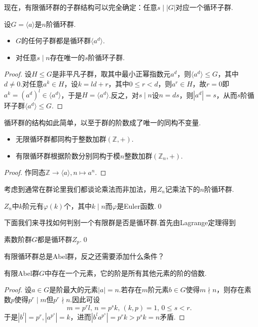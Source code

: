 现在，有限循环群的子群结构可以完全确定：任意$s\mid|G|$对应一个循环子群.
\begin{thm}
	设$G=\langle a\rangle$是$n$阶循环群.
	\begin{itemize}
		\item $G$的任何子群都是循环群$\langle a^d\rangle$.
		\item 对任意$s\mid n$存在唯一的$s$阶循环子群.
	\end{itemize}
\end{thm}
\begin{proof}
	设$H\le G$是非平凡子群，取其中最小正幂指数元$a^d$，则$\langle a^d\rangle\le G$，其中$d\ne 0$.对任意$a^k\in H$，设$k=ld+r$，其中$0\le r<d$，则$a^r\in H$，故$r=0$即$a^k=(a^d)^l\in\langle a^d\rangle $，于是$H=\langle a^d\rangle $.反之，对$s\mid n$设$n=ds$，则$|a^d|=s$，从而$s$阶循环子群$\langle a^d\rangle \le G$.
\end{proof}

循环群的结构如此简单，以至于群的阶数成了唯一的同构不变量.
\begin{thm}[(循环群结构)]
	\begin{itemize}
		\item 无限循环群都同构于整数加群$(\mathbb{Z},+)$.
		\item 有限循环群根据阶数分别同构于模$n$整数加群$(\mathbb{Z}_n,+)$\footnotemark.
	\end{itemize}
\end{thm}
\begin{proof}
	作同态$\mathbb{Z}\to\langle a\rangle ,n\mapsto a^n$.
\end{proof}

考虑到通常在群论里我们都谈论乘法而非加法，用$Z_n$记乘法下的$n$阶循环群.
\begin{cor}
	$Z_n$中$k$阶元有$\varphi(k)$个，其中$k\mid n$而$\varphi$是Euler函数.\qed
\end{cor}

下面我们来寻找如何判别一个有限群是否是循环群.首先由Lagrange定理得到
\begin{thm}
	素数阶群$G$都是循环群$Z_p$.\qed
\end{thm}

有限循环群总是Abel群，反之还需要添加什么条件？
\begin{lemma*}
	有限Abel群$G$中存在一个元素，它的阶是所有其他元素的阶的倍数.
\end{lemma*}
\begin{proof}
	设$a\in G$是阶最大的元素$|a|=n$.若存在$m$阶元素$b\in G$使得$m\nmid n$，则存在素数$p$使得$p^r\mid m$但$p^r\nmid n$.因此可设
	\[
		m=p^rl,\,n=p^sk,\,(k,p)=1,\,0\le s<r.
	\]
	于是$|b^l|=p^r,|a^{p^s}|=k$，进而$|b^la^{p^s}|=p^rk>p^sk=n$矛盾.
\end{proof}

